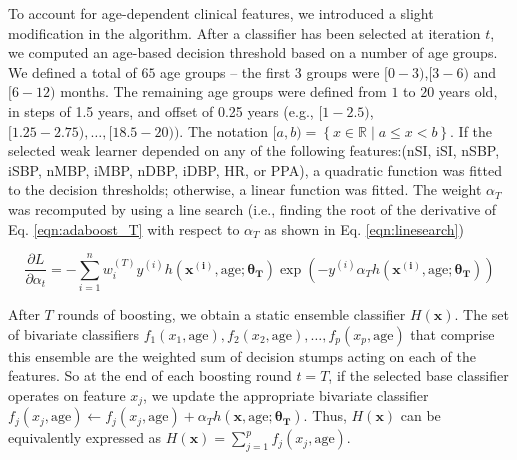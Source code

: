 \documentclass[
   technote
]{phildoc}
\newcommand{\ie}{i.e.,}
\newcommand{\eg}{e.g.,}
\newcommand{\eq}{Eq.}
\begin{document}
To account for age-dependent clinical features, we introduced a slight modification in the algorithm. After a classifier has been selected at iteration $t$, we computed an age-based decision threshold based on a number of age groups. We defined a total of $65$ age groups -- the first 3 groups were $[0-3)$,$[3-6)$ and $[6-12)$ months. The remaining age groups were defined from $1$ to $20$ years old, in steps of 1.5 years, and offset of 0.25 years (\eg{} $[1-2.5)$,$[1.25-2.75),\dots,[18.5-20))$. The notation $[a,b) = \left\{x \in \mathbb{R} \mid a\leq x<b \right\}$. If the selected weak learner depended on any of the following features:(nSI, iSI, nSBP, iSBP, nMBP, iMBP, nDBP, iDBP, HR, or PPA), a quadratic function was fitted to the decision thresholds; otherwise, a linear function was fitted. The weight $\alpha_T$ was recomputed by using a line search (\ie{} finding the root of the derivative of \eq{} \ref{eqn:adaboost_T} with respect to $\alpha_T$ as shown in \eq{} \ref{eqn:linesearch})


\begin{equation}
\label{eqn:linesearch}
\frac{\partial L}{\partial\alpha_{t}}= -\sum_{i=1}^n w_i^{(T)}y^{(i)} h\left(\bm{x^{(i)}},\text{age}; \bm{\theta_T}\right) \exp\left(-y^{(i)} \alpha_T h\left(\bm{x^{(i)}},\text{age}; \bm{\theta_T}\right)\right)
\end{equation}

After $T$ rounds of boosting, we obtain a static ensemble classifier $H(\bm{x})$.  The set of bivariate classifiers $f_1(x_1,\text{age}),f_2(x_2,\text{age}),\dots,f_p(x_p,\text{age})$ that comprise this ensemble are the weighted sum of decision stumps acting on each of the features. So at the end of each boosting round $t=T$, if the selected base classifier operates on feature $x_j$, we update the appropriate bivariate classifier $f_j(x_j,\text{age}) \gets f_j(x_j,\text{age}) + \alpha_T h(\bm{x},\text{age};\bm{\theta_T})$.  Thus, $H(\bm{x})$ can be equivalently expressed as $H(\bm{x})=\sum_{j=1}^p f_j(x_j,\text{age})$. 
\end{document}
